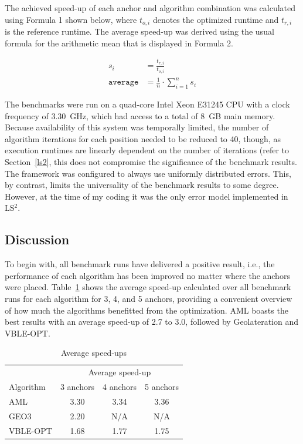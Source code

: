 The achieved speed-up of each anchor and algorithm combination was calculated using Formula 1 shown below, where $t_{o,i}$ denotes the optimized runtime and $t_{r,i}$ is the reference runtime. The average speed-up was derived using the usual formula for the arithmetic mean that is displayed in Formula 2.

\begin{align}
s_{i}& = \frac{t_{r,i}}{t_{o,i}} \\
\texttt{average}& = \frac{1}{n} \cdot \sum_{i = 1}^n s_{i}
\end{align}

The benchmarks were run on a quad-core Intel Xeon E31245 CPU with a clock frequency of 3.30~GHz, which had access to a total of 8~GB main memory. Because availability of this system was temporally limited, the number of algorithm iterations for each position needed to be reduced to 40, though, as execution runtimes are linearly dependent on the number of iterations (refer to Section~\ref{ls2}, this does not compromise the significance of the benchmark results. The framework was configured to always use uniformly distributed errors. This, by contrast, limits the universality of the benchmark results to some degree. However, at the time of my coding it was the only error model implemented in LS$^{2}$.


\subsection{Discussion}
To begin with, all benchmark runs have delivered a positive result, i.e., the performance of each algorithm has been improved no matter where the anchors were placed. Table~\ref{average_table} shows the average speed-up calculated over all benchmark runs for each algorithm for 3, 4, and 5 anchors, providing a convenient overview of how much the algorithms benefitted from the optimization. AML boasts the best results with an average speed-up of 2.7 to 3.0, followed by Geolateration and VBLE-OPT.

\begin{table}[ht]
\begin{center}
\caption{Average speed-ups}
\begin{tabular}{lccc} 
\toprule
& \multicolumn{3}{c}{Average speed-up} \\ 
\cmidrule(r){2-4}
Algorithm & 3 anchors & 4 anchors & 5 anchors \\
\midrule
AML & 3.30 & 3.34 & 3.36 \\
GEO3 & 2.20 & N/A & N/A \\ 
VBLE-OPT & 1.68 & 1.77& 1.75 \\
\bottomrule
\end{tabular}
\label{average_table}
\end{center}
\end{table}

